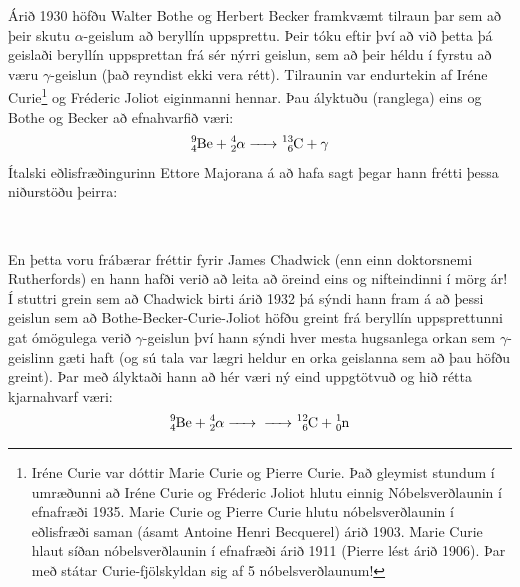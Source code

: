 Árið 1930 höfðu Walter Bothe og Herbert Becker framkvæmt tilraun þar sem að þeir skutu $\alpha$-geislum að beryllín uppsprettu. Þeir tóku eftir því að við þetta þá geislaði beryllín uppsprettan frá sér nýrri geislun, sem að þeir héldu í fyrstu að væru $\gamma$-geislun (það reyndist ekki vera rétt). Tilraunin var endurtekin af Iréne Curie\footnote{Iréne Curie var dóttir Marie Curie og Pierre Curie. Það gleymist stundum í umræðunni að Iréne Curie og Fréderic Joliot hlutu einnig Nóbelsverðlaunin í efnafræði 1935. Marie Curie og Pierre Curie hlutu nóbelsverðlaunin í eðlisfræði saman (ásamt Antoine Henri Becquerel) árið 1903. Marie Curie hlaut síðan nóbelsverðlaunin í efnafræði árið 1911 (Pierre lést árið 1906). Þar með státar Curie-fjölskyldan sig af 5 nóbelsverðlaunum!} og Fréderic Joliot eiginmanni hennar. Þau ályktuðu (ranglega) eins og Bothe og Becker að efnahvarfið væri:
\begin{align*}
    \ce{^{9}_{4}Be + ^{4}_{2}$\alpha$ -> ^{13}_{6}C + $\gamma$}
\end{align*}
Ítalski eðlisfræðingurinn Ettore Majorana á að hafa sagt þegar hann frétti þessa niðurstöðu þeirra:

\begin{tcolorbox}

 \\

\vspace{-0.3cm}
\end{tcolorbox}


En þetta voru frábærar fréttir fyrir James Chadwick (enn einn doktorsnemi Rutherfords) en hann hafði verið að leita að öreind eins og nifteindinni í mörg ár! Í stuttri grein sem að Chadwick birti árið 1932 þá sýndi hann fram á að þessi geislun sem að Bothe-Becker-Curie-Joliot höfðu greint frá beryllín uppsprettunni gat ómögulega verið $\gamma$-geislun því hann sýndi hver mesta hugsanlega orkan sem $\gamma$-geislinn gæti haft (og sú tala var lægri heldur en orka geislanna sem að þau höfðu greint). Þar með ályktaði hann að hér væri ný eind uppgtötvuð og hið rétta kjarnahvarf væri:
\begin{align*}
    \ce{^{9}_{4}Be + ^{4}_{2}$\alpha$ -> -> ^{12}_{6}C + ^{1}_{0}n}
\end{align*}


